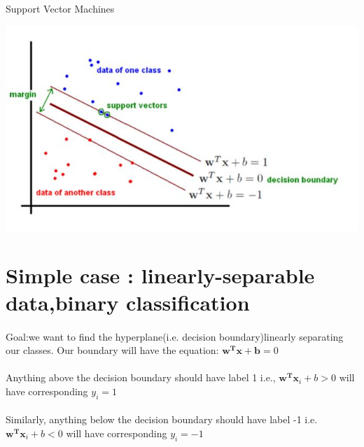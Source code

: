 \documentclass[a4paper]{article}
\begin{document}
\begin{algorithm}
 \caption{Support Vector Machines ~\cite{svm1
   }}
    \begin{algorithmic}
 \begin{sloppypar}
 
  \includegraphics[width=\linewidth]{svm.jpg}
  
  \label{fig:svm1}


\end{sloppypar}
 
 \section{ Simple case : linearly-separable data,binary classification}
 
\paragraph{}
 Goal:we want to find the hyperplane(i.e. decision boundary)linearly
 separating our classes. Our boundary will have the equation: $\textbf{w}^ \textbf{T}\textbf{x}+ \textbf{b} = 0$
 
 \paragraph{}
 Anything above the decision boundary should have label 1 i.e., $\textbf{w}^\textbf{T}\textbf {x}_{i} + b  > 0 $ will have corresponding $y_{i} = 1$
 
\paragraph{}
Similarly, anything below the decision boundary should have label -1 i.e.
 $\textbf{w}^\textbf{T}\textbf {x}_{i} + b  < 0 $ will have corresponding $y_{i} = - 1$


\end{algorithmic}
\end{algorithm}
\end{document}
